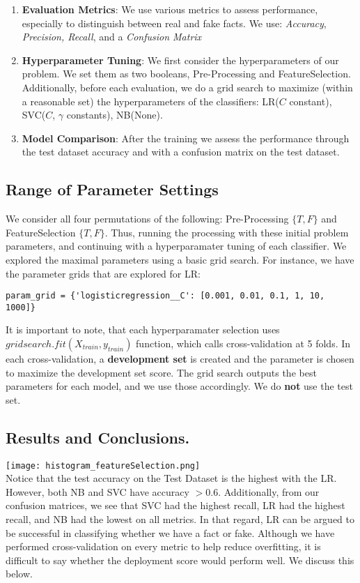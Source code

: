 \documentclass{article}
\begin{document}
\begin{enumerate}
\item \textbf{Evaluation Metrics}: We use various metrics to assess performance, especially to distinguish between real and fake facts. We use: \textit{Accuracy}, \textit{Precision, Recall}, and a \textit{Confusion Matrix}
\item \textbf{Hyperparameter Tuning}: We first consider the hyperparameters of our problem. We set them as two booleans, Pre-Processing and FeatureSelection. Additionally, before each evaluation, we do a grid search to maximize (within a reasonable set) the hyperparameters of the classifiers: LR($C$ constant), SVC($C$, $\gamma$ constants), NB(None).
\item \textbf{Model Comparison}: After the training we assess the performance through the test dataset accuracy and with a confusion matrix on the test dataset.
\end{enumerate}
\subsection{Range of Parameter Settings}
We consider all four permutations of the following: Pre-Processing $\{T,F\}$ and FeatureSelection $\{T,F\}$. Thus, running the processing with these initial problem parameters, and continuing with a hyperparamater tuning of each classifier. We explored the maximal parameters using a basic grid search. 
For instance, we have the parameter grids that are explored for LR:\\
\begin{verbatim}
param_grid = {'logisticregression__C': [0.001, 0.01, 0.1, 1, 10, 1000]}
\end{verbatim}
It is important to note, that each hyperparamater selection uses $gridsearch.fit(X_{train}, y_{train})$ function, which calls cross-validation at 5 folds. In each cross-validation, a \textbf{development set} is created and the parameter is chosen to maximize the development set score. The grid search outputs the best parameters for each model, and we use those accordingly. We do \textbf{not} use the test set.
\subsection{Results and Conclusions.}
\texttt{[image: histogram\_featureSelection.png]}\\
Notice that the test accuracy on the Test Dataset is the highest with the LR. However, both NB and SVC have accuracy $> 0.6$. Additionally, from our confusion matrices, we see that SVC had the highest recall, LR had the highest recall, and NB had the lowest on all metrics. In that regard, LR can be argued to be successful in classifying whether we have a fact or fake. Although we have performed cross-validation on every metric to help reduce overfitting, it is difficult to say whether the deployment score would perform well. We discuss this below. \\
\end{document}
